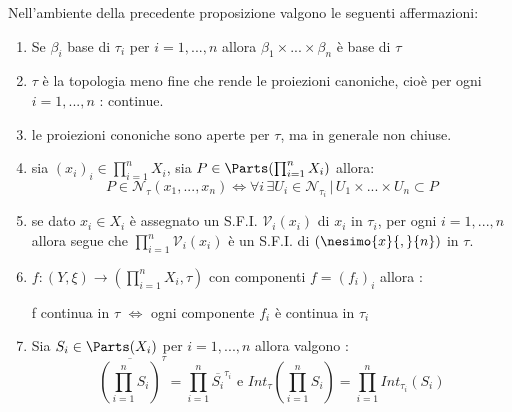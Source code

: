 \documentclass[a4paper]{article}
\begin{document}
\begin{prop}
	Nell'ambiente della precedente proposizione valgono le seguenti affermazioni:
	\begin{enumerate}
		\item Se $\beta _i $ base di $\tau_i$ per $i=1,...,n$ allora $\beta_1 \times ... \times \beta_n $ è base di $\tau $ 
		\item $\tau $ è la topologia meno fine che rende le proiezioni canoniche, cioè per ogni $i=1,...,n$ : 
		continue. 
		\item le proiezioni cononiche sono aperte per $\tau $, ma in generale non chiuse.
		\item sia $(x_i)_i \in \prod_{i=1}^n X_i $, sia $P \in \Parts (\prod_{i=1}^n X_i) $ allora: 
		\begin{equation*}
		P \in \mathcal{N}_\tau (x_1,...,x_n) \Leftrightarrow \forall i \, \exists U_i \in \mathcal{N}_{\tau_i} \, | \, U_1\times ... \times U_n \subset P 
		\end{equation*}
		\item se dato $x_i \in X_i $ è assegnato un S.F.I. $\mathcal{V}_i(x_i) $ di $x_i $ in $\tau_i$, per ogni $ i = 1,...,n $ allora segue che $\prod_{i=1}^n \mathcal{V}_i (x_i ) $ è un S.F.I. di $(\nesimo{x}{,}{n} ) $ in $\tau$.
		\item $f : (Y, \xi) \to ( \prod_{i=1}^n X_i , \tau ) $ con componenti $f = (f_i)_i $ allora :
		\begin{center}
			f continua in $\tau$ $\Leftrightarrow$ ogni componente $ f_i $ è continua in $\tau_i $
		\end{center}
		\item Sia $S_ i \in \Parts ( X_i ) $ per $i=1,...,n $ allora valgono : 
			\begin{equation*}
				\overline{ \left( \prod_{i=1}^{n} S_i \right) } ^\tau = \prod_{i=1}^{n}\overline{S_i}^{\tau_i} \text{ e } Int_\tau\left({\prod_{i=1}^{n} S_i} \right)  = \prod_{i=1}^{n}Int _{\tau_i} ({S_i} )
			\end{equation*}		
		\end{enumerate}
\end{prop}
\end{document}

